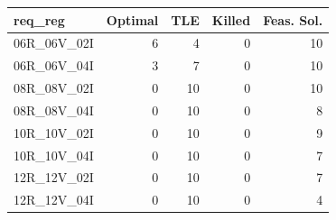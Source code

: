
\begin{tabular}{lrrrr}
\toprule
req\_reg & Optimal & TLE & Killed & Feas. Sol.\\
\midrule
06R\_06V\_02I & 6 & 4 & 0 & 10\\
06R\_06V\_04I & 3 & 7 & 0 & 10\\
08R\_08V\_02I & 0 & 10 & 0 & 10\\
08R\_08V\_04I & 0 & 10 & 0 & 8\\
10R\_10V\_02I & 0 & 10 & 0 & 9\\
\addlinespace
10R\_10V\_04I & 0 & 10 & 0 & 7\\
12R\_12V\_02I & 0 & 10 & 0 & 7\\
12R\_12V\_04I & 0 & 10 & 0 & 4\\
\bottomrule
\end{tabular}
